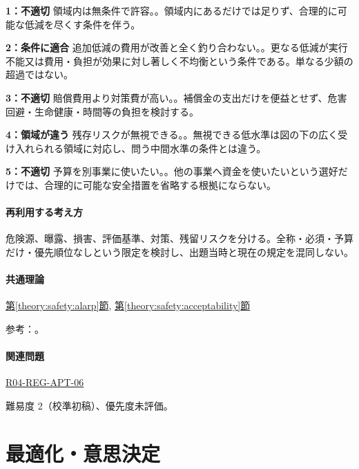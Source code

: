\noindent\textbf{1：不適切} 領域内は無条件で許容。。領域内にあるだけでは足りず、合理的に可能な低減を尽くす条件を伴う。\par

\noindent\textbf{2：条件に適合} 追加低減の費用が改善と全く釣り合わない。。更なる低減が実行不能又は費用・負担が効果に対し著しく不均衡という条件である。単なる少額の超過ではない。\par

\noindent\textbf{3：不適切} 賠償費用より対策費が高い。。補償金の支出だけを便益とせず、危害回避・生命健康・時間等の負担を検討する。\par

\noindent\textbf{4：領域が違う} 残存リスクが無視できる。。無視できる低水準は図の下の広く受け入れられる領域に対応し、問う中間水準の条件とは違う。\par

\noindent\textbf{5：不適切} 予算を別事業に使いたい。。他の事業へ資金を使いたいという選好だけでは、合理的に可能な安全措置を省略する根拠にならない。\par

\paragraph{再利用する考え方} 危険源、曝露、損害、評価基準、対策、残留リスクを分ける。全称・必須・予算だけ・優先順位なしという限定を検討し、出題当時と現在の規定を混同しない。

\paragraph{共通理論} \hyperref[theory:safety:alarp]{第\ref*{theory:safety:alarp}節}, \hyperref[theory:safety:acceptability]{第\ref*{theory:safety:acceptability}節}

\par 参考：\cite{saf_parliament2006,saf_ra2006}。

\paragraph{関連問題} \hyperref[q:r04-reg-apt-06]{R04-REG-APT-06}

\par 難易度 2（校準初稿）、優先度未評価。

\section{最適化・意思決定}

